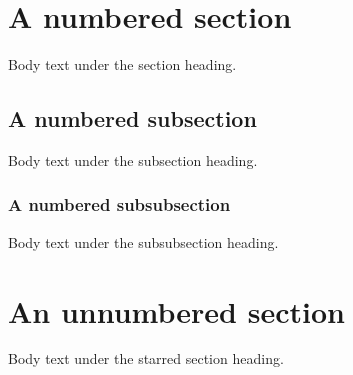 \documentclass{article}
\begin{document}
\section{A numbered section}
Body text under the section heading.

\subsection{A numbered subsection}
Body text under the subsection heading.

\subsubsection{A numbered subsubsection}
Body text under the subsubsection heading.

\section*{An unnumbered section}
Body text under the starred section heading.
\end{document}
